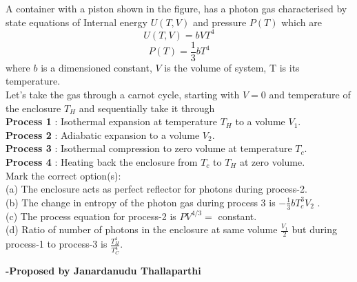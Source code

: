 \documentclass[11pt,a4paper]{scrartcl}
\begin{document}
\begin{problem}
\begin{center}

\end{center}
\vspace{5mm}

A container with a piston shown in the figure, has a photon gas characterised by state equations of Internal energy $U(T,V)$ and pressure $P(T)$ which are 
\[U(T,V) = b V T^4\] 
\[P(T) = \frac{1}{3} bT^4\]
where $b$ is a dimensioned constant, $V$ is the volume of system, T is its temperature. \\
Let's take the gas through a carnot cycle, starting with $V=0$ and temperature of the enclosure $T_H$ and sequentially take it through \\
\textbf{Process 1} : Isothermal expansion at temperature $T_H$ to a volume $V_1$. \\
\textbf{Process 2} : Adiabatic expansion to a volume $V_2$. \\
\textbf{Process 3} : Isothermal compression to zero volume at temperature $T_c$.\\
\textbf{Process 4} : Heating back the enclosure from $T_c$ to $T_H$ at zero volume. \\

Mark the correct option(s): \\
(a) The enclosure acts as perfect reflector for photons during process-2.\\
(b) The change in entropy of the photon gas during process 3 is $- \frac{1}{3} b T_{c}^{3} V_2$ . \\
(c) The process equation for process-2 is $PV^{4/3}=$ constant. \\
(d) Ratio of number of photons in the enclosure at same volume $\frac{V_1}{2}$ but during process-1 to process-3 is $\frac{T_{H}^{4}}{T_{C}^{4}}$.



\end{problem}
\begin{flushright}
\textbf{\Large{-Proposed by Janardanudu Thallaparthi}}
\end{flushright}
\end{document}
